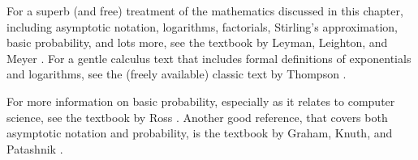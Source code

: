 For a superb (and free) treatment of the mathematics discussed in this
chapter, including asymptotic notation, logarithms, factorials, Stirling's
approximation, basic probability, and lots more, see the textbook by
Leyman, Leighton, and Meyer \cite{llm11}.  For a gentle calculus text
that includes formal definitions of exponentials and logarithms, see the
(freely available) classic text by Thompson \cite{t14}.

For more information on basic probability, especially as it relates to
computer science, see the textbook by Ross \cite{r01}.  Another good
reference, that covers both asymptotic notation and probability, is the
textbook by Graham, Knuth, and Patashnik \cite{gkp94}.





